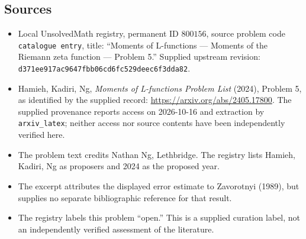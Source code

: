 \documentclass[11pt]{article}
\begin{document}
\subsection{Sources}
\begin{itemize}
\item Local UnsolvedMath registry, permanent ID \(800156\), source problem code \texttt{catalogue entry}, title: ``Moments of L-functions --- Moments of the Riemann zeta function --- Problem 5.'' Supplied upstream revision: \texttt{d371ee917ac9647fbb06cd6fc529deec6f3dda82}.
\item Hamieh, Kadiri, Ng, \emph{Moments of L-functions Problem List} (2024), Problem 5, as identified by the supplied record: \url{https://arxiv.org/abs/2405.17800}. The supplied provenance reports access on 2026-10-16 and extraction by \texttt{arxiv\_latex}; neither access nor source contents have been independently verified here.
\item The problem text credits Nathan Ng, Lethbridge. The registry lists Hamieh, Kadiri, Ng as proposers and 2024 as the proposed year.
\item The excerpt attributes the displayed error estimate to Zavorotnyi (1989), but supplies no separate bibliographic reference for that result.
\item The registry labels this problem ``open.'' This is a supplied curation label, not an independently verified assessment of the literature.
\end{itemize}
\end{document}
